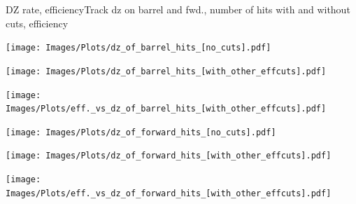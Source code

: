 \documentclass{beamer}
\begin{document}
\begin{frame}{DZ rate, efficiency}{Track dz on barrel and fwd., number of hits with and without cuts, efficiency}
  \begin{minipage}{0.32\textwidth}
    \centering
    \texttt{[image: Images/Plots/dz\_of\_barrel\_hits\_[no\_cuts].pdf]}
  \end{minipage}%
  \hspace{0.01\textwidth}%
  \begin{minipage}{0.32\textwidth}
    \centering
    \texttt{[image: Images/Plots/dz\_of\_barrel\_hits\_[with\_other\_effcuts].pdf]}
  \end{minipage}%
  \hspace{0.01\textwidth}%
  \begin{minipage}{0.32\textwidth}
    \centering
    \texttt{[image: Images/Plots/eff.\_vs\_dz\_of\_barrel\_hits\_[with\_other\_effcuts].pdf]}
  \end{minipage}
  \vspace*{0.2cm}
  \begin{minipage}{0.32\textwidth}
    \centering
    \texttt{[image: Images/Plots/dz\_of\_forward\_hits\_[no\_cuts].pdf]}
  \end{minipage}%
  \hspace{0.01\textwidth}%
  \begin{minipage}{0.32\textwidth}
    \centering
    \texttt{[image: Images/Plots/dz\_of\_forward\_hits\_[with\_other\_effcuts].pdf]}
  \end{minipage}%
  \hspace{0.01\textwidth}%
  \begin{minipage}{0.32\textwidth}
    \centering
    \texttt{[image: Images/Plots/eff.\_vs\_dz\_of\_forward\_hits\_[with\_other\_effcuts].pdf]}
  \end{minipage}
\end{frame}
\end{document}
